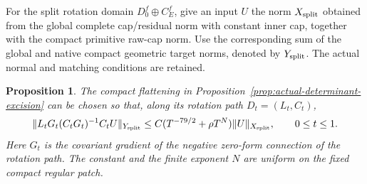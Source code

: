 \documentclass[11pt]{amsart}
\newtheorem{proposition}[theorem]{Proposition}
\theoremstyle{definition}
\theoremstyle{remark}
\theoremstyle{plain}
\begin{document}
For the split rotation domain $D_0^f\oplus C_E^f$, give
an input $U$ the norm $X_{\rm split}$ obtained from the
global complete cap/residual norm with constant inner cap,
together with the compact primitive raw-cap norm.
Use the corresponding sum of the global and native compact
geometric target norms, denoted by $Y_{\rm split}$.
The actual normal and matching conditions are retained.

\begin{proposition}\label{prop:excision-rotation-potential}
The compact flattening in
Proposition~\ref{prop:actual-determinant-excision} can be chosen
so that, along its rotation path $D_t=(L_t,C_t)$,
\begin{equation}\label{eq:excision-rotation-gauge-coupling}
 \|L_tG_t(C_tG_t)^{-1}C_tU\|_{Y_{\rm split}}
       \leq C(T^{-79/2}+\rho T^N)\|U\|_{X_{\rm split}},
                    \qquad 0\leq t\leq1 .
\end{equation}
Here $G_t$ is the covariant gradient of the negative
zero-form connection of the rotation path. The constant
and the finite exponent $N$ are uniform on the fixed
compact regular patch.
\end{proposition}
\end{document}
